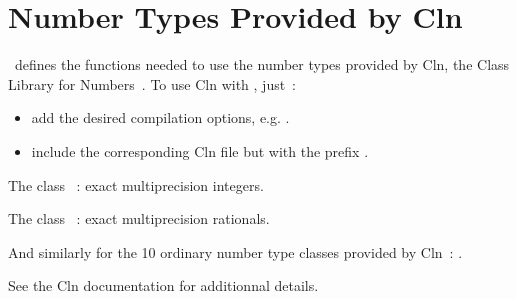 \section{Number Types Provided by {\sc Cln}}
\label{CLN}


\cgal\ defines the functions needed to use the number types provided by
{\sc Cln}, the Class Library for Numbers~\cite{cln}.
To use {\sc Cln} with \cgal, just~:

\begin{itemize}
\item add the desired compilation options, e.g.
      \mbox{}.
\item include the corresponding {\sc Cln} file but with the prefix
.
\end{itemize}


The class ~: exact multiprecision integers.


The class ~: exact multiprecision rationals.

And similarly for the 10 ordinary number type classes provided by {\sc Cln}~:
.

See the {\sc Cln} documentation for additionnal details.
